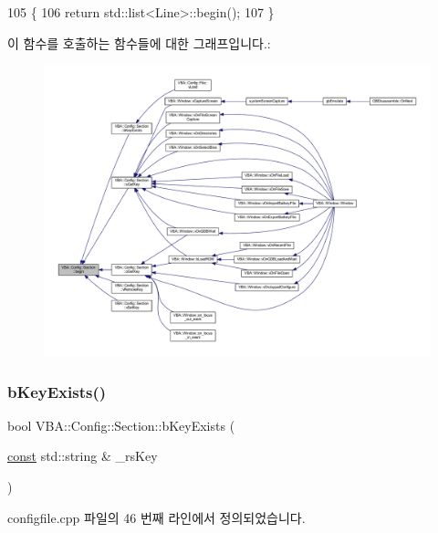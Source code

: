 \begin{DoxyCode}
105     \{
106       \textcolor{keywordflow}{return} std::list<Line>::begin();
107     \}
\end{DoxyCode}
이 함수를 호출하는 함수들에 대한 그래프입니다.\+:
\nopagebreak
\begin{figure}[H]
\begin{center}
\leavevmode
\includegraphics[width=350pt]{class_v_b_a_1_1_config_1_1_section_ac345183b43a45fd3eeaa646eac631390_icgraph}
\end{center}
\end{figure}
\mbox{\label{class_v_b_a_1_1_config_1_1_section_a2c189e6a7e47e3c13a4e3eb6aa7f477e}} 
\subsubsection{\texorpdfstring{b\+Key\+Exists()}{bKeyExists()}}
{\footnotesize\ttfamily bool V\+B\+A\+::\+Config\+::\+Section\+::b\+Key\+Exists (\begin{DoxyParamCaption}\item[{\mbox{\hyperlink{getopt1_8c_a2c212835823e3c54a8ab6d95c652660e}{const}} std\+::string \&}]{\+\_\+rs\+Key }\end{DoxyParamCaption})}



configfile.\+cpp 파일의 46 번째 라인에서 정의되었습니다.


